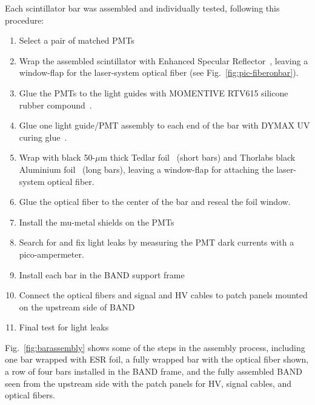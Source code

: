 \documentclass[3p,twocolumn]{elsarticle}
\begin{document}
Each scintillator bar was assembled and individually tested, following this procedure:
\begin{enumerate}
\item Select a pair of matched PMTs
\item Wrap the assembled scintillator with Enhanced Specular Reflector~\cite{3MESR}, leaving a window-flap for the laser-system optical fiber (see Fig.~\ref{fig:pic-fiberonbar}).
\item Glue the PMTs to the light guides with MOMENTIVE RTV615 silicone rubber compound~\cite{softglue}.
\item Glue one light guide/PMT assembly to each end of the bar with DYMAX
  UV curing glue~\cite{uvglue}.
\item Wrap with black 50-$\mu$m thick Tedlar\textregistered{} foil~\cite{tedlarfoil} (short bars) and Thorlabs black Aluminium foil~\cite{thorlabsfoil} (long bars), leaving a
  window-flap for attaching the laser-system optical fiber.
\item Glue the optical fiber to the center of the bar and reseal the foil window.
\item Install the mu-metal shields on the PMTs 
\item Search for and fix light leaks by measuring the PMT dark currents with a pico-ampermeter.
\item Install each bar in the BAND support frame
\item Connect the optical fibers and signal and HV cables to patch panels mounted on the upstream side of BAND
\item Final test for light leaks
\end{enumerate}
Fig.~\ref{fig:barassembly} shows some of the steps in the assembly process,
including one bar wrapped with ESR foil, a fully wrapped bar with the
optical fiber shown, a row of four bars installed in the BAND frame,
and the fully assembled BAND seen from the upstream side with the
patch panels for HV, signal cables, and optical fibers.
\end{document}
